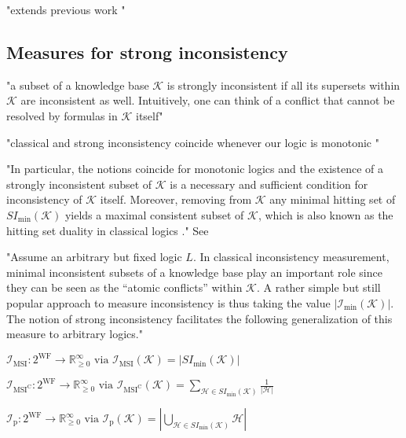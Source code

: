 "extends previous work \cite{ulbricht_measuring_2018}"

\subsection{Measures for strong inconsistency}
\cite{ulbricht_handling_2020}

"a subset of a knowledge base \(\mathcal{K}\) is strongly inconsistent if all its supersets within \(\mathcal{K}\) are inconsistent as well. Intuitively, one can think of a conflict that cannot be resolved by formulas in \(\mathcal{K}\) itself"

"classical and strong inconsistency coincide whenever our logic is monotonic \cite{brewka_strong_2019}"

"In particular, the notions coincide for monotonic logics and the existence of a strongly inconsistent subset of \(\mathcal{K}\) is a necessary and sufficient condition for inconsistency of \(\mathcal{K}\) itself. Moreover, removing from \(\mathcal{K}\) any minimal hitting set of \(SI_{\min}(\mathcal{K})\) yields a maximal consistent subset of \(\mathcal{K}\), which is also known as the hitting set duality in classical logics \cite{reiter_theory_1987}." See \cite{brewka_strong_2017}

"Assume an arbitrary but fixed logic \(L\). In classical inconsistency measurement, minimal inconsistent subsets of a knowledge base play an important role since they can be seen as the “atomic conflicts” within \(\mathcal{K}\). A rather simple but still popular approach to measure inconsistency is thus taking the value \(\left| \mathcal{I}_{\min}(\mathcal{K}) \right|\). The notion of strong inconsistency facilitates the following generalization of this measure to arbitrary logics."

\(\mathcal{I}_{\text{MSI}}: 2^{\text{WF}} \rightarrow \mathbb{R}_{\geq 0}^{\infty} \text{ via } \mathcal{I}_{\text{MSI}}(\mathcal{K}) = \left| SI_{\min}(\mathcal{K}) \right|\)

\(\mathcal{I}_{\text{MSI}^\text{C}}: 2^{\text{WF}} \rightarrow \mathbb{R}_{\geq 0}^{\infty} \text{ via } \mathcal{I}_{\text{MSI}^\text{C}}(\mathcal{K}) = \sum_{\mathcal{H} \in SI_{\min}(\mathcal{K})} \frac{1}{|\mathcal{H}|}\)
\cite{hunter_measuring_2008}

\(\mathcal{I}_{\text{p}}: 2^{\text{WF}} \rightarrow \mathbb{R}_{\geq 0}^{\infty} \text{ via } \mathcal{I}_{\text{p}}(\mathcal{K}) = \left| \bigcup_{\mathcal{H} \in SI_{\min}(\mathcal{K})} \mathcal{H} \right|\)
\cite{liu_measuring_2011}